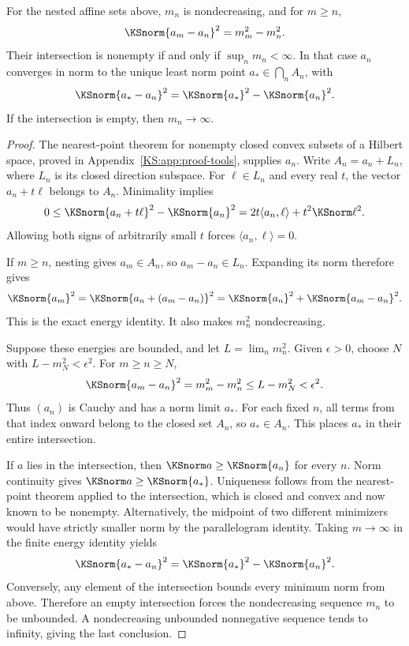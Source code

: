 \begin{KStheorem}\label{KS:WR02}
For the nested affine sets above, $m_n$ is nondecreasing, and for $m\ge n$,
\begin{equation}\label{KS:eq:nested-energy}
 \KSnorm{a_m-a_n}^2=m_m^2-m_n^2.
\end{equation}
Their intersection is nonempty if and only if $\sup_n m_n<\infty$. In that case $a_n$ converges in norm to the unique least norm point $a_*\in\bigcap_n A_n$, with
\[
 \KSnorm{a_*-a_n}^2=\KSnorm{a_*}^2-\KSnorm{a_n}^2.
\]
If the intersection is empty, then $m_n\to\infty$.
\end{KStheorem}
\begin{proof}
The nearest-point theorem for nonempty closed convex subsets of a Hilbert space, proved in Appendix~\ref{KS:app:proof-tools}, supplies $a_n$. Write $A_n=a_n+L_n$, where $L_n$ is its closed direction subspace. For $\ell\in L_n$ and every real $t$, the vector $a_n+t\ell$ belongs to $A_n$. Minimality implies
\[
 0\le\KSnorm{a_n+t\ell}^2-\KSnorm{a_n}^2
 =2t\langle a_n,\ell\rangle+t^2\KSnorm\ell^2.
\]
Allowing both signs of arbitrarily small $t$ forces $\langle a_n,\ell\rangle=0$.

If $m\ge n$, nesting gives $a_m\in A_n$, so $a_m-a_n\in L_n$. Expanding its norm therefore gives
\[
 \KSnorm{a_m}^2
 =\KSnorm{a_n+(a_m-a_n)}^2
 =\KSnorm{a_n}^2+\KSnorm{a_m-a_n}^2.
\]
This is the exact energy identity. It also makes $m_n^2$ nondecreasing.

Suppose these energies are bounded, and let $L=\lim_n m_n^2$. Given $\epsilon>0$, choose $N$ with $L-m_N^2<\epsilon^2$. For $m\ge n\ge N$,
\[
 \KSnorm{a_m-a_n}^2=m_m^2-m_n^2\le L-m_N^2<\epsilon^2.
\]
Thus $(a_n)$ is Cauchy and has a norm limit $a_*$. For each fixed $n$, all terms from that index onward belong to the closed set $A_n$, so $a_*\in A_n$. This places $a_*$ in their entire intersection.

If $a$ lies in the intersection, then $\KSnorm a\ge\KSnorm{a_n}$ for every $n$. Norm continuity gives $\KSnorm a\ge\KSnorm{a_*}$. Uniqueness follows from the nearest-point theorem applied to the intersection, which is closed and convex and now known to be nonempty. Alternatively, the midpoint of two different minimizers would have strictly smaller norm by the parallelogram identity. Taking $m\to\infty$ in the finite energy identity yields
\[
 \KSnorm{a_*-a_n}^2=\KSnorm{a_*}^2-\KSnorm{a_n}^2.
\]
Conversely, any element of the intersection bounds every minimum norm from above. Therefore an empty intersection forces the nondecreasing sequence $m_n$ to be unbounded. A nondecreasing unbounded nonnegative sequence tends to infinity, giving the last conclusion.
\end{proof}

